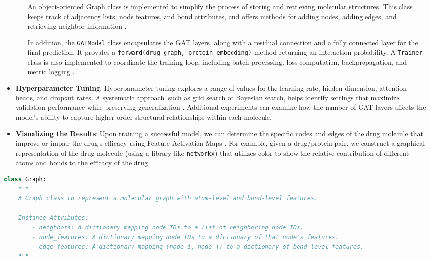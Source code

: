 \documentclass[fontsize=11pt]{article}
\begin{document}
\begin{itemize}
\begin{itemize}
        \quad An object-oriented Graph class is implemented to simplify the process of storing and retrieving molecular structures. This class keeps track of adjacency lists, node features, and bond attributes, and offers methods for adding nodes, adding edges, and retrieving neighbor information \cite{Chen2016}.

        \quad In addition, the \texttt{GATModel} class encapsulates the GAT layers, along with a residual connection and a fully connected layer for the final prediction. It provides a \texttt{forward(drug\_graph, protein\_embedding)} method returning an interaction probability. A \texttt{Trainer} class is also implemented to coordinate the training loop, including batch processing, loss computation, backpropagation, and metric logging \cite{Chen2016}.
    \end{itemize}

    \item \textbf{Hyperparameter Tuning}: Hyperparameter tuning explores a range of values for the learning rate, hidden dimension, attention heads, and dropout rates. A systematic approach, such as grid search or Bayesian search, helps identify settings that maximize validation performance while preserving generalization \cite{Kanakala2023}. Additional experiments can examine how the number of GAT layers affects the model’s ability to capture higher-order structural relationships within each molecule.
    
    \item \textbf{Visualizing the Results}: Upon training a successful model, we can determine the specific nodes and edges of the drug molecule that improve or impair the drug's efficacy using Feature Activation Maps \cite{Pope2019}. For example, given a drug/protein pair, we construct a graphical representation of the drug molecule (using a library like \texttt{networkx}) that utilizes color to show the relative contribution of different atoms and bonds to the efficacy of the drug \cite{Pope2019}.
    
\end{itemize}

\begin{lstlisting}[language=Python, caption={Python implementation of a Graph class for molecular data}, label={lst:graph_class}]
class Graph:
    """
    A Graph class to represent a molecular graph with atom-level and bond-level features.

    Instance Attributes:
        - neighbors: A dictionary mapping node IDs to a list of neighboring node IDs.
        - node_features: A dictionary mapping node IDs to a dictionary of that node's features.
        - edge_features: A dictionary mapping (node_i, node_j) to a dictionary of bond-level features.
    """
\end{lstlisting}
\end{document}
